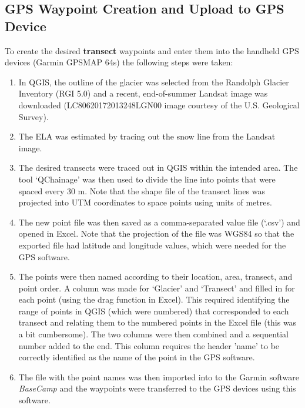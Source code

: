 \documentclass{sfuthesis}
\begin{document}
\begin{appendices} %
	\chapter{GPS Waypoint Creation and Upload to GPS Device}
	
	To create the desired \textbf{transect} waypoints and enter them into the handheld GPS devices (Garmin GPSMAP 64s) the following steps were taken:
\begin{enumerate}
\item In QGIS, the outline of the glacier was selected from the Randolph Glacier Inventory (RGI 5.0) \citep{Pfeffer2014} and a recent, end-of-summer Landsat image was downloaded (LC80620172013248LGN00 image courtesy of the U.S. Geological Survey). 
\item The ELA was estimated by tracing out the snow line from the Landsat image.
\item The desired transects were traced out in QGIS within the intended area. The tool `QChainage' was then used to divide the line into points that were spaced every 30 m. Note that the shape file of the transect lines was projected into UTM coordinates to space points using units of metres. 
\item The new point file was then saved as a comma-separated value file (`.csv') and opened in Excel. Note that the projection of the file was WGS84 so that the exported file had latitude and longitude values, which were needed for the GPS software.
\item The points were then named according to their location, area, transect, and point order. A column was made for `Glacier' and `Transect' and filled in for each point (using the drag function in Excel). This required identifying the range of points in QGIS (which were numbered) that corresponded to each transect and relating them to the numbered points in the Excel file (this was a bit cumbersome). The two columns were then combined and a sequential number added to the end. This column requires the header 'name' to be correctly identified as the name of the point in the GPS software.
\item The file with the point names was then imported into to the Garmin software \textit{BaseCamp} and the waypoints were transferred to the GPS devices using this software. 
\end{enumerate}


\end{appendices}
\end{document}

